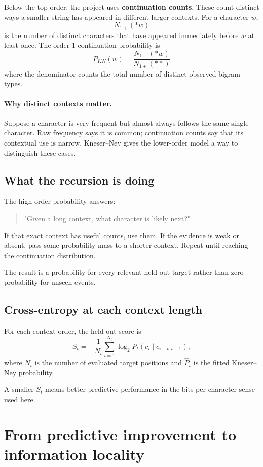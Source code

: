 \documentclass[11pt]{article}
\begin{document}
Below the top order, the project uses \textbf{continuation counts}. These count distinct ways a smaller string has appeared in different larger contexts. For a character $w$,
\[
N_{1+}(\ast w)
\]
is the number of distinct characters that have appeared immediately before $w$ at least once. The order-1 continuation probability is
\[
\boxed{
P_{KN}(w)=
\frac{N_{1+}(\ast w)}{N_{1+}(\ast\ast)}
}
\]
where the denominator counts the total number of distinct observed bigram types.

\paragraph{Why distinct contexts matter.}
Suppose a character is very frequent but almost always follows the same single character. Raw frequency says it is common; continuation counts say that its contextual use is narrow. Kneser--Ney gives the lower-order model a way to distinguish these cases.

\subsection{What the recursion is doing}
The high-order probability answers:
\begin{quote}
"Given a long context, what character is likely next?"
\end{quote}
If that exact context has useful counts, use them. If the evidence is weak or absent, pass some probability mass to a shorter context. Repeat until reaching the continuation distribution.

The result is a probability for every relevant held-out target rather than zero probability for unseen events.

\subsection{Cross-entropy at each context length}
For each context order, the held-out score is
\[
S_t=-\frac{1}{N_t}\sum_{i=1}^{N_t}\log_2\hat P_t(c_i\mid c_{i-t:i-1}),
\]
where $N_t$ is the number of evaluated target positions and $\hat P_t$ is the fitted Kneser--Ney probability.

A smaller $S_t$ means better predictive performance in the bits-per-character sense used here.

\newpage
\section{From predictive improvement to information locality}
\end{document}

